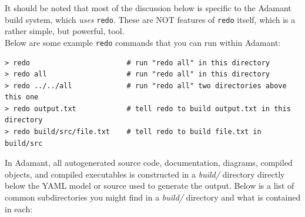 It should be noted that most of the discussion below is specific to the Adamant build system, which \textit{uses} \texttt{redo}. These are NOT features of \texttt{redo} itself, which is a rather simple, but powerful, tool. \\

Below are some example \texttt{redo} commands that you can run within Adamant:

\vspace{5mm} %
\begin{verbatim}
> redo                       # run "redo all" in this directory
> redo all                   # run "redo all" in this directory
> redo ../../all             # run "redo all" two directories above this one
> redo output.txt            # tell redo to build output.txt in this directory
> redo build/src/file.txt    # tell redo to build file.txt in build/src
\end{verbatim}
\vspace{5mm} %

In Adamant, all autogenerated source code, documentation, diagrams, compiled objects, and compiled executables is constructed in a \textit{build/} directory directly below the YAML model or source used to generate the output. Below is a list of common subdirectories you might find in a \textit{build/} directory and what is contained in each:

